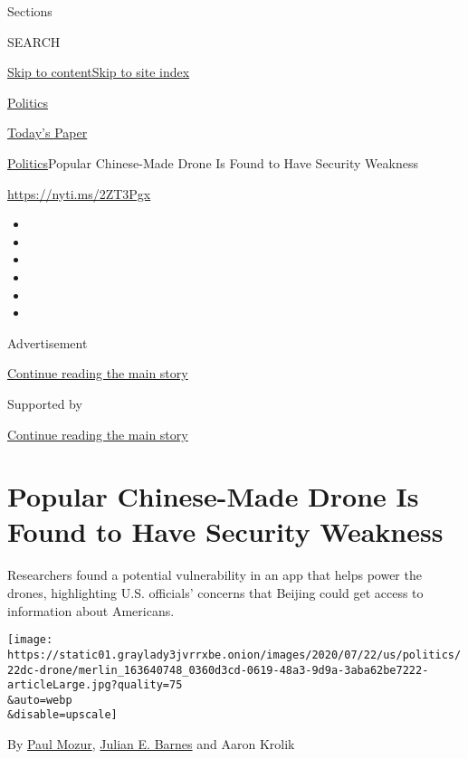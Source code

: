 Sections

SEARCH

\protect\hyperlink{site-content}{Skip to
content}\protect\hyperlink{site-index}{Skip to site index}

\href{https://www.nytimes3xbfgragh.onion/section/politics}{Politics}

\href{https://myaccount.nytimes3xbfgragh.onion/auth/login?response_type=cookie\&client_id=vi}{}

\href{https://www.nytimes3xbfgragh.onion/section/todayspaper}{Today's
Paper}

\href{/section/politics}{Politics}\textbar{}Popular Chinese-Made Drone
Is Found to Have Security Weakness

\url{https://nyti.ms/2ZT3Pgx}

\begin{itemize}
\item
\item
\item
\item
\item
\item
\end{itemize}

Advertisement

\protect\hyperlink{after-top}{Continue reading the main story}

Supported by

\protect\hyperlink{after-sponsor}{Continue reading the main story}

\hypertarget{popular-chinese-made-drone-is-found-to-have-security-weakness}{%
\section{Popular Chinese-Made Drone Is Found to Have Security
Weakness}\label{popular-chinese-made-drone-is-found-to-have-security-weakness}}

Researchers found a potential vulnerability in an app that helps power
the drones, highlighting U.S. officials' concerns that Beijing could get
access to information about Americans.

\texttt{[image: https://static01.graylady3jvrrxbe.onion/images/2020/07/22/us/politics/22dc-drone/merlin\_163640748\_0360d3cd-0619-48a3-9d9a-3aba62be7222-articleLarge.jpg?quality=75\\\&auto=webp\\\&disable=upscale]}

By \href{https://www.nytimes3xbfgragh.onion/by/paul-mozur}{Paul Mozur},
\href{https://www.nytimes3xbfgragh.onion/by/julian-e-barnes}{Julian E.
Barnes} and Aaron Krolik

